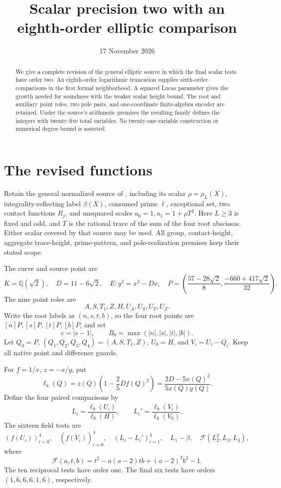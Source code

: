 \documentclass[11pt,a4paper]{article}
\title{Scalar precision two with an eighth-order elliptic comparison}
\author{}\date{17 November 2026}
\newcommand{\Q}{\mathbb Q}\newcommand{\Z}{\mathbb Z}
\begin{document}
\maketitle
\begin{abstract}
We give a complete revision of the general elliptic source in which
the final scalar tests have order two. An eighth-order logarithmic
truncation supplies sixth-order comparisons in the first formal
neighborhood. A squared Lucas parameter gives the growth needed for
soundness with the weaker scalar height bound. The root and auxiliary
point roles, two pole pairs, and one-coordinate finite-algebra encoder
are retained. Under the source's arithmetic premises the resulting
family defines the integers with twenty-five total variables. No
twenty-one-variable construction or numerical degree bound is asserted.
\end{abstract}

\section{The revised functions}

Retain the general normalized source of \cite{Reweighted}, including
its scalar \(\rho=\rho_L(X)\), integrality-reflecting label \(\beta(X)\),
consumed prime \(\ell\), exceptional set, two contact functions \(R_j\),
and unsquared scales \(a_0=1,a_1=1+\rho T^2\).
Here \(L\ge3\) is fixed and odd, and \(T\) is the rational trace of
the sum of the four root abscissas. Either scalar covered by that
source may be used. All group, contact-height, aggregate trace-height,
prime-pattern, and pole-realization premises keep their stated scope.

The curve and source point are
\[
 K=\Q(\sqrt2),\quad D=11-6\sqrt2,\quad E:y^2=x^3-Dx,
 \quad
 P=\left(\frac{57-28\sqrt2}{8},\frac{-660+417\sqrt2}{32}\right).
\]
The nine point roles are
\[
 A,S,T_1,Z,H,U_A,U_S,U_T,U_Z.
\]
Write the root labels as \((n,s,t,b)\), so the four root points are
\([n]P,[s]P,[t]P,[b]P\), and set
\[
 c=|s-1|,\qquad B_0=\max(|n|,|s|,|t|,|b|).
\]
Let \(Q_0=P\), \((Q_1,Q_2,Q_3,Q_4)=(A,S,T_1,Z)\),
\(U_0=H\), and \(V_i=U_i-Q_i\). Keep all native point and
difference guards.

For \(f=1/x\), \(z=-x/y\), put
\begin{equation}\label{eq:ell8}
 \ell_8(Q)=z(Q)\left(1-\frac25D f(Q)^2\right)
          =\frac{2D-5x(Q)^2}{5x(Q)y(Q)}.
\end{equation}
Define the four paired comparisons by
\[
 L_i=\frac{\ell_8(U_i)}{\ell_8(H)},\qquad
 L_i'=\overline{\frac{\ell_8(V_i)}{\ell_8(V_0)}}.
\]
The sixteen field tests are
\begin{equation}\label{eq:fieldtests}
 (f(U_i))_{i=0}^4,\quad
 (\overline{f(V_i)})_{i=0}^4,\quad
 (L_i-L_i')_{i=1}^4,\quad
 L_1-\beta,\quad \mathcal F(L_2^2,L_3,L_4),
\end{equation}
where
\[
 \mathcal F(a,t,b)=t^2-a(a-2)tb+(a-2)^2b^2-1.
\]
The ten reciprocal tests have order one. The final six tests have
orders \((1,6,6,6,1,6)\), respectively.
\end{document}

